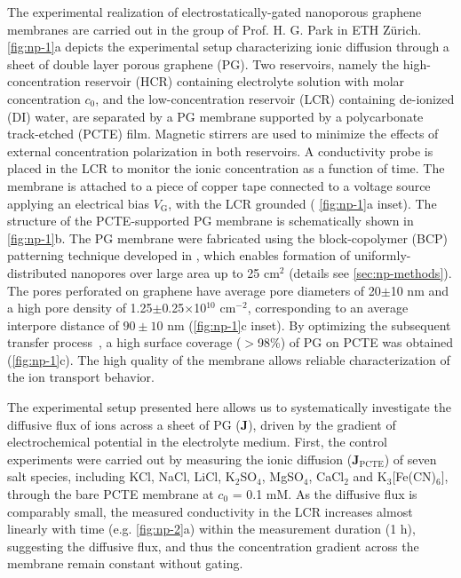 The experimental realization of electrostatically-gated nanoporous
graphene membranes are carried out in the group of Prof. H. G. Park
 in ETH Zürich. 
%
 \autoref{fig:np-1}a depicts the experimental setup characterizing
ionic diffusion through a sheet of double layer porous graphene
(PG).
%
Two reservoirs, namely the high-concentration reservoir (HCR)
containing electrolyte solution with molar concentration $c_0$, and
the low-concentration reservoir (LCR) containing de-ionized (DI)
water, are separated by a PG membrane supported by a polycarbonate
track-etched (PCTE) film.
%
Magnetic stirrers are used to minimize the effects of external
concentration polarization in both reservoirs.
%
A conductivity
probe is placed in the LCR to monitor the ionic concentration as a
function of time. The membrane is attached to a piece of copper tape
connected to a voltage source applying an electrical bias
$V_{\mathrm{G}}$, with the LCR grounded ( \autoref{fig:np-1}a
inset).
%
The structure of the PCTE-supported PG membrane is schematically shown
in \autoref{fig:np-1}b. The PG membrane were fabricated using the
block-copolymer (BCP) patterning technique developed in
\cite{Choi_2018_wafer_scale_gr}, which enables formation of
uniformly-distributed nanopores over large area up to 25 cm$^{2}$
(details see \autoref{sec:np-methods}).
%
The pores perforated on graphene have average pore diameters of
20$\pm$10 nm and a high pore density of 1.25$\pm$0.25$\times$10$^{10}$
cm$^{-2}$, corresponding to an average inter\-pore distance of
$90\pm10$ nm  (\autoref{fig:np-1}c inset).
%
By optimizing the subsequent transfer
process~\cite{Choi_2018_wafer_scale_gr}, a high surface coverage
($>$98\%) of PG on PCTE was obtained (\autoref{fig:np-1}c).
The high quality of the membrane allows
reliable characterization of the ion transport behavior.
%


The experimental setup presented
here allows us to systematically investigate the diffusive flux of
ions across a sheet of PG ($\symbf{J}$), driven by the gradient of
electrochemical potential in the electrolyte medium.
%
First, the control experiments were carried out by measuring the ionic
diffusion ($\mathbf{J}_{\mathrm{PCTE}}$) of seven salt species,
including KCl, NaCl, LiCl, K$_{2}$SO$_{4}$, MgSO$_{4}$, CaCl$_{2}$ and
K$_{3}$[Fe(CN)$_{6}$], through the bare PCTE membrane at $c_{0}$ = 0.1
mM.
%
As the diffusive flux is comparably small, the measured conductivity
in the LCR increases almost linearly with time (e.g.
\autoref{fig:np-2}a) within the measurement duration (1 h), suggesting
the diffusive flux, and thus the concentration gradient across the
membrane remain constant without gating.
%

